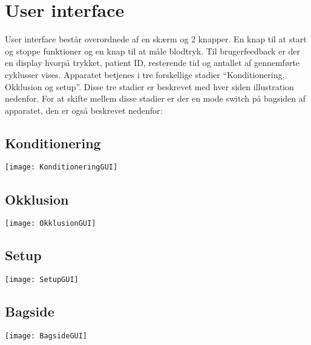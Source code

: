 \section{User interface}
User interface består overordnede af en skærm og 2 knapper. En knap til at start og stoppe funktioner og en knap til at måle blodtryk. Til brugerfeedback er der en display hvorpå trykket, patient ID, resterende tid og antallet af gennemførte cyklusser vises. Apparatet betjenes i tre forskellige stadier “Konditionering, Okklusion og setup”. Disse tre stadier er beskrevet med hver siden illustration nedenfor. For at skifte mellem disse stadier er der en mode switch på bagsiden af apparatet, den er også beskrevet nedenfor: 

\subsection{Konditionering}
\texttt{[image: KonditioneringGUI]}
\subsection{Okklusion}
\texttt{[image: OkklusionGUI]}

\subsection{Setup}
\texttt{[image: SetupGUI]}

\subsection{Bagside}
\texttt{[image: BagsideGUI]}
